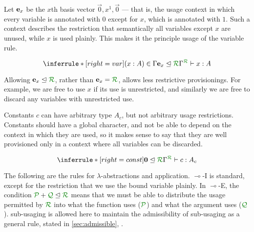 Let $\mathbf{e}_{x}$ be the $x$th basis vector $\vec 0, x^1, \vec 0$ --- that is, the
usage context in which every variable is annotated with $0$ except for $x$,
which is annotated with $1$.
Such a context describes the restriction that semantically all variables except
$x$ are unused, while $x$ is used plainly.
This makes it the principle usage of the variable rule.

\[
  \inferrule*[right=var]
  {(x : A) \in \Gamma
    \\ \subrctx{\basis x}{\resctx R}
  }
  {\ctx{\Gamma}{R} \vdash x : A}
\]

Allowing $\basis x \subres \resctx R$, rather than $\basis x = \resctx R$,
allows less restrictive provisionings.
For example, we are free to use $x$ if its use is unrestricted, and similarly we
are free to discard any variables with unrestricted use. 

Constants $c$ can have arbitrary type $A_c$, but not arbitrary usage
restrictions.
Constants should have a global character, and not be able to depend on the
context in which they are used, so it makes sense to say that they are well
provisioned only in a context where all variables can be discarded. 

\[
  \inferrule*[right=const]
  {\subrctx{\vct 0}{\resctx R}}
  {\ctx{\Gamma}{R} \vdash c : A_c}
\]

The following are the rules for $\lambda$-abstractions and application.
$\multimap$-I is standard, except for the restriction that we use the bound
variable plainly.
In $\multimap$-E, the condition $\resctx P + \resctx Q \subres \resctx R$
means that we must be able to distribute the usage permitted by $\resctx R$ into
what the function uses ($\resctx P$) and what the argument uses ($\resctx Q$).
sub-usaging is allowed here to maintain the admissibility of sub-usaging
as a general rule, stated in \autoref{sec:admissible}, .


